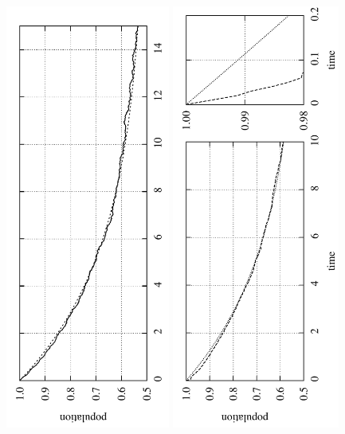 \begin{figure}[h]
\centering
{}
\includegraphics[height=14cm, angle=270]{Images/me-exp.pdf}
\includegraphics[height=14cm, angle=270]{Images/merough-exp.pdf}

\end{figure}
